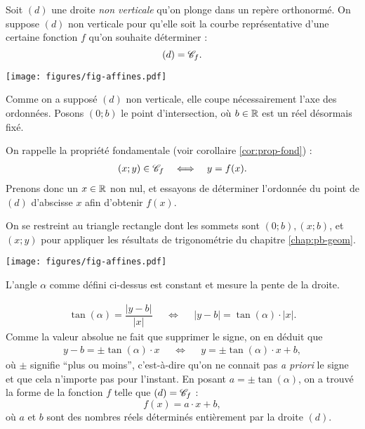 \begin{multicols}{2}

Soit $(d)$ une droite \emph{non verticale} qu'on plonge dans un repère orthonormé.
On suppose $(d)$ non verticale pour qu'elle soit la courbe représentative d'une certaine fonction $f$ qu'on souhaite déterminer : \[(d) = \mathcal{C}_f. \]

	\begin{center}
	\texttt{[image: figures/fig-affines.pdf]}
	\end{center}


Comme on a supposé $(d)$ non verticale, elle coupe nécessairement l'axe des ordonnées.
Posons $(0; b)$ le point d'intersection, où $b\in\mathbb{R}$ est un réel désormais fixé.

On rappelle la propriété fondamentale (voir corollaire \ref{cor:prop-fond}) : 
	\begin{align*}
		(x;y) \in \mathcal{C}_f && \iff && y = f(x).
	\end{align*}
Prenons donc un $x \in \mathbb{R}$ non nul, et essayons de déterminer l'ordonnée du point de $(d)$ d'abscisse $x$ afin d'obtenir $f(x)$.

\vspace{30pt}

On se restreint au triangle rectangle dont les sommets sont $(0;b), (x ; b)$, et $(x;y)$ pour appliquer les résultats de trigonométrie du chapitre \ref{chap:pb-geom}. %

	\begin{center}
	\texttt{[image: figures/fig-affines.pdf]}
	\end{center}

L'angle $\alpha$ comme défini ci-dessus est constant et mesure la pente de la droite.

	\begin{align*}
		\tan(\alpha) = \dfrac{|y-b|}{|x|} && \iff && |y-b| = \tan(\alpha) \cdot |x|.
	\end{align*}
Comme la valeur absolue ne fait que supprimer le signe, on en déduit que
	\begin{align*}
		y - b = \pm \tan(\alpha) \cdot x && \iff && y = \pm \tan(\alpha) \cdot x + b,
	\end{align*}
où $\pm$ signifie ``plus ou moins'', c'est-à-dire qu'on ne connait pas \emph{a priori} le signe et que cela n'importe pas pour l'instant.
En posant $a = \pm \tan(\alpha)$, on a trouvé la forme de la fonction $f$ telle que $(d) = \mathcal{C}_f$ :
	\[ f(x) = a\cdot x + b, \]
où $a$ et $b$ sont des nombres réels déterminés entièrement par la droite $(d)$.


	
\end{multicols}

